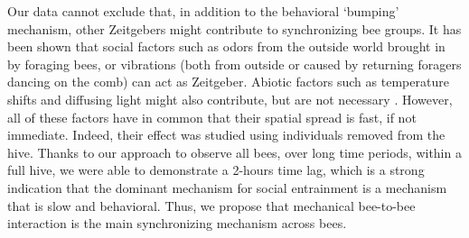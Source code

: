 \documentclass{article}
\newcommand{\added}[1]{{\color{blue}#1}}
\newcommand{\added}[1]{#1}
\begin{document}

 
Our data cannot exclude that, in addition to the behavioral ‘bumping’ mechanism, other Zeitgebers might contribute to synchronizing bee groups. It has been shown that social factors such as odors from the outside world brought in by foraging bees, \added{or} vibrations (both from outside or caused by returning foragers dancing on the comb) \cite{moritz_self-organization_1994, siehler_colony_2020, siehler_remarkable_2021} \added{can act as Zeitgeber}. Abiotic factors such as temperature shifts and diffusing light might also contribute, but are not necessary \cite{siehler_remarkable_2021}. However, all of these factors have in common that their spatial spread is fast, if not immediate. Indeed, their effect was studied using individuals removed from the hive. Thanks to our approach to observe all bees, over long time periods, within a full hive, we were able to demonstrate a 2-hours time lag, which is a strong indication that the dominant mechanism for social entrainment is a mechanism that is slow and behavioral. Thus, we propose that mechanical bee-to-bee interaction is the main synchronizing mechanism across bees. 
 
\end{document}

